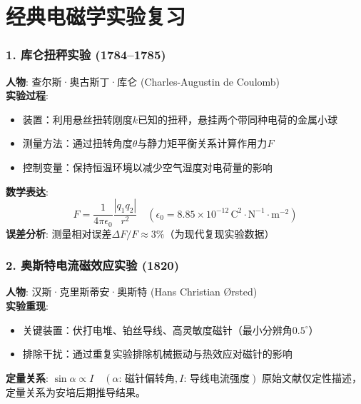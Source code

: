 \ifx\allfiles\undefined
{}  %
\usepackage[dvipsnames]{xcolor}
\usepackage{amsmath}   %
\usepackage{graphicx}
\usetikzlibrary{arrows, calc, decorations.pathmorphing}
\allowdisplaybreaks %
\newcommand{\pa}{\partial}
\newcommand{\mathminus}{\!\!-\!\!} %
\newcommand{\vsup}[1]{\raisebox{-0.1ex}{$\scriptstyle #1$}}
\newcommand{\lsup}[1]{\raisebox{-0.85ex}{$\scriptstyle #1$}}


\else
\fi
\chapter{经典电磁学实验复习}
\subsection*{1. 库仑扭秤实验 (1784--1785)}
\textbf{人物}: 查尔斯·奥古斯丁·库仑 (Charles-Augustin de Coulomb)\\
\textbf{实验过程}:
\begin{itemize}
    \item 装置：利用悬丝扭转刚度$k$已知的扭秤，悬挂两个带同种电荷的金属小球
    \item 测量方法：通过扭转角度$\theta$与静力矩平衡关系计算作用力$F$
    \item 控制变量：保持恒温环境以减少空气湿度对电荷量的影响
\end{itemize}
\textbf{数学表达}:
\begin{equation*}
    F = \frac{1}{4\pi\epsilon_0} \frac{|q_1 q_2|}{r^2} \quad \left(\epsilon_0 = 8.85 \times 10^{-12} \, \text{C}^2 \cdot \text{N}^{-1} \cdot \text{m}^{-2}\right)
\end{equation*}
\textbf{误差分析}: 测量相对误差$\Delta F/F \approx 3\%$（为现代复现实验数据）

\subsection*{2. 奥斯特电流磁效应实验 (1820)}
\textbf{人物}: 汉斯·克里斯蒂安·奥斯特 (Hans Christian Ørsted)\\
\textbf{实验重现}:
\begin{itemize}
    \item 关键装置：伏打电堆、铂丝导线、高灵敏度磁针（最小分辨角$0.5^\circ$）
    \item 排除干扰：通过重复实验排除机械振动与热效应对磁针的影响
\end{itemize}
\textbf{定量关系}:
    \(\displaystyle \sin\alpha \propto I \quad (\alpha\text{: 磁针偏转角}, I\text{: 导线电流强度})\)
    原始文献仅定性描述，定量关系为安培后期推导结果。

